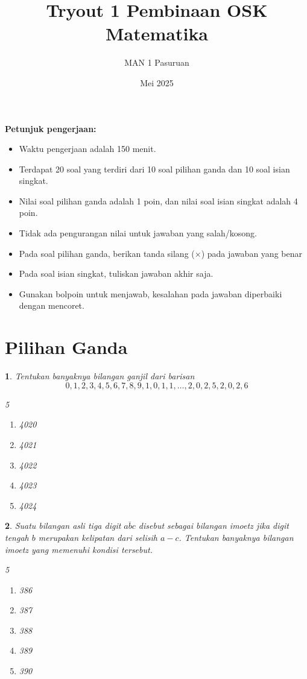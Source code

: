 \documentclass[11pt,a4paper,DIV=12]{scrartcl}
\theoremstyle{problemstyle}
\newtheorem{problem}{}
\theoremstyle{answerstyle}
\begin{document}
\title{Tryout 1 Pembinaan OSK Matematika}
\author{MAN 1 Pasuruan}
\date{Mei 2025}
\maketitle
\noindent\textbf{Petunjuk pengerjaan:}
\begin{itemize}
  \item Waktu pengerjaan adalah 150 menit.
  \item Terdapat 20 soal yang terdiri dari 10 soal pilihan ganda dan 10 soal isian singkat.
  \item Nilai soal pilihan ganda adalah {\color{green!70!black}1 poin}, dan nilai soal isian singkat adalah {\color{green!70!black}4 poin}.
  \item {\color{red}Tidak ada} pengurangan nilai untuk jawaban yang salah/kosong.
  \item Pada soal pilihan ganda, berikan tanda {\color{blue}silang ($\times$)} pada jawaban yang benar
  \item Pada soal isian singkat, tuliskan {\color{blue}jawaban akhir} saja.
  \item Gunakan bolpoin untuk menjawab, kesalahan pada jawaban diperbaiki dengan mencoret.
\end{itemize}

\section*{Pilihan Ganda}
\begin{problem}
  Tentukan banyaknya bilangan ganjil dari barisan
  $$0,1,2,3,4,5,6,7,8,9,1,0,1,1,\ldots,2,0,2,5,2,0,2,6$$
  \begin{multicols}{5}
    \begin{enumerate}[label=(\Alph*)]
      \item 4020
      \item 4021
      \item 4022
      \item 4023
      \item 4024
    \end{enumerate}
  \end{multicols}
\end{problem}

\begin{problem}
  Suatu bilangan asli tiga digit $\overline{abc}$ disebut sebagai bilangan \textit{imoetz} jika digit tengah $b$ merupakan kelipatan dari selisih $a-c$. Tentukan banyaknya bilangan \textit{imoetz} yang memenuhi kondisi tersebut.
  \begin{multicols}{5}
    \begin{enumerate}[label=(\Alph*)]
      \item 386
      \item 387
      \item 388
      \item 389
      \item 390
    \end{enumerate}
  \end{multicols}
\end{problem}
\end{document}
